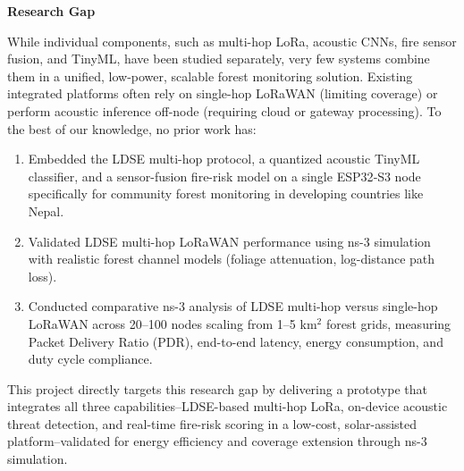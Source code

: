\newpage
\textbf{Research Gap}

While individual components, such as multi-hop LoRa, acoustic CNNs, fire sensor fusion, and TinyML, have been studied separately, very few systems combine them in a unified, low-power, scalable forest monitoring solution. Existing integrated platforms often rely on single-hop LoRaWAN (limiting coverage) or perform acoustic inference off-node (requiring cloud or gateway processing). To the best of our knowledge, no prior work has:

\begin{enumerate}
    \item Embedded the LDSE multi-hop protocol, a quantized acoustic TinyML classifier, and a sensor-fusion fire-risk model on a single ESP32‑S3 node specifically for community forest monitoring in developing countries like Nepal.
    \item Validated LDSE multi-hop LoRaWAN performance using ns-3 simulation with realistic forest channel models (foliage attenuation, log-distance path loss).
    \item Conducted comparative ns-3 analysis of LDSE multi-hop versus single-hop LoRaWAN across 20--100 nodes scaling from 1--5 km$^2$ forest grids, measuring Packet Delivery Ratio (PDR), end-to-end latency, energy consumption, and duty cycle compliance.
\end{enumerate}

This project directly targets this research gap by delivering a prototype that integrates all three capabilities--LDSE-based multi-hop LoRa, on-device acoustic threat detection, and real-time fire-risk scoring in a low-cost, solar-assisted platform--validated for energy efficiency and coverage extension through ns-3 simulation.

\clearpage
